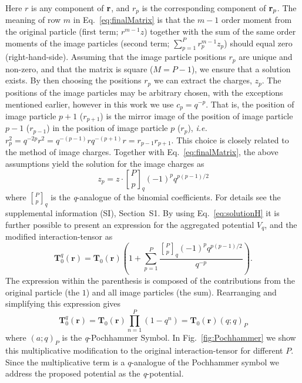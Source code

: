 \documentclass[
journal=jctcce,
manuscript=letter]{achemso}
\begin{document}
Here $r$ is any component of ${\bf r}$, and $r_p$ is the corresponding component of ${\bf r}_p$. The meaning of row $m$ in Eq.~\ref{eq:finalMatrix} is that the $m-1$ order moment from the original particle (first term; $r^{m-1}z$) together with the sum of the same order moments of the image particles (second term; $\sum_{p=1}^Pr_p^{m-1}z_p$) should equal zero (right-hand-side).
Assuming that the image particle positions $r_p$ are unique and non-zero, and that the matrix is square ($M=P-1$), we ensure that a solution exists.\cite{Macon1958}
By then choosing the positions $r_p$ we can extract the charges, $z_p$.
The positions of the image particles may be arbitrary chosen, with the exceptions mentioned earlier, however in this work we use $c_p = q^{-p}$.
That is, the position of image particle $p+1$ ($r_{p+1}$) is the mirror image of the position of image particle $p-1$ ($r_{p-1}$) in the position of image particle $p$ ($r_{p}$), \emph{i.e.} $r_p^2 = q^{-2p}r^2 = q^{-(p-1)}rq^{-(p+1)}r = r_{p-1}r_{p+1}$.
This choice is closely related to the method of image charges\cite{tikhonov1963equations,friedman1975image}.
Together with Eq.~\ref{eq:finalMatrix}, the above assumptions yield the solution for the image charges as
\begin{equation}
\label{eq:solutionH}
z_{p} = z\cdot {P \brack p}_q(-1)^pq^{p(p-1)/2}
\end{equation}
where ${P \brack p}_q $ is the \emph{q}-analogue of the binomial coefficients\cite{comtetadvanced,kac2002quantum}.
For details see the supplemental information (SI), Section~S1.
By using Eq.~\ref{eq:solutionH} it is further possible to present an expression for the aggregated potential $V_{q}$, and the modified interaction-tensor as
\begin{equation}
\boldsymbol{T}^{q}_0(\boldsymbol{r}) = \boldsymbol{T}_0(\boldsymbol{r})\left(1 +  \sum_{p=1}^{P}\frac{{P \brack p}_q(-1)^pq^{p(p-1)/2}}{q^{-p}}\right).
\end{equation}
The expression within the parenthesis is composed of the contributions from the original particle (the $1$) and all image particles (the sum).
Rearranging and simplifying\cite{kac2002quantum} this expression gives
\begin{equation}
\label{eq:modified_tensor}
\boldsymbol{T}^{q}_0(\boldsymbol{r}) = \boldsymbol{T}_0(\boldsymbol{r})\prod_{n=1}^{P}(1-q^n) = \boldsymbol{T}_0(\boldsymbol{r})(q;q)_{P}
\end{equation}
where $(a;q)_{P}$ is the \emph{q}-Pochhammer Symbol. In Fig.~\ref{fig:Pochhammer} we show this multiplicative modification to the original interaction-tensor for different $P$. Since the multiplicative term is a $q$-analogue of the Pochhammer symbol we address the proposed potential as the \emph{q}-potential.
\end{document}
